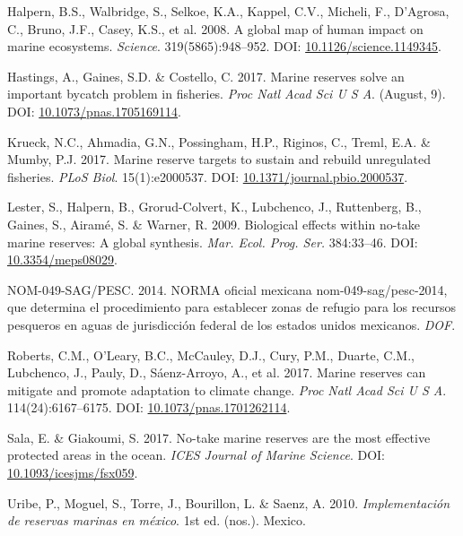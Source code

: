 \documentclass[12pt,]{article}
\begin{document}
\hypertarget{ref-halpern_2008-dK}{}
Halpern, B.S., Walbridge, S., Selkoe, K.A., Kappel, C.V., Micheli, F.,
D'Agrosa, C., Bruno, J.F., Casey, K.S., et al. 2008. A global map of
human impact on marine ecosystems. \emph{Science}. 319(5865):948--952.
DOI:
\href{https://doi.org/10.1126/science.1149345}{10.1126/science.1149345}.

\hypertarget{ref-hastings_2017-sm}{}
Hastings, A., Gaines, S.D. \& Costello, C. 2017. Marine reserves solve
an important bycatch problem in fisheries. \emph{Proc Natl Acad Sci U S
A}. (August, 9). DOI:
\href{https://doi.org/10.1073/pnas.1705169114}{10.1073/pnas.1705169114}.

\hypertarget{ref-krueck_2017-J1}{}
Krueck, N.C., Ahmadia, G.N., Possingham, H.P., Riginos, C., Treml, E.A.
\& Mumby, P.J. 2017. Marine reserve targets to sustain and rebuild
unregulated fisheries. \emph{PLoS Biol}. 15(1):e2000537. DOI:
\href{https://doi.org/10.1371/journal.pbio.2000537}{10.1371/journal.pbio.2000537}.

\hypertarget{ref-lester_2009-Ks}{}
Lester, S., Halpern, B., Grorud-Colvert, K., Lubchenco, J., Ruttenberg,
B., Gaines, S., Airamé, S. \& Warner, R. 2009. Biological effects within
no-take marine reserves: A global synthesis. \emph{Mar. Ecol. Prog.
Ser.} 384:33--46. DOI:
\href{https://doi.org/10.3354/meps08029}{10.3354/meps08029}.

\hypertarget{ref-nom049sagpesc_2014-V6}{}
NOM-049-SAG/PESC. 2014. NORMA oficial mexicana nom-049-sag/pesc-2014,
que determina el procedimiento para establecer zonas de refugio para los
recursos pesqueros en aguas de jurisdicción federal de los estados
unidos mexicanos. \emph{DOF}.

\hypertarget{ref-roberts_2017-J9}{}
Roberts, C.M., O'Leary, B.C., McCauley, D.J., Cury, P.M., Duarte, C.M.,
Lubchenco, J., Pauly, D., Sáenz-Arroyo, A., et al. 2017. Marine reserves
can mitigate and promote adaptation to climate change. \emph{Proc Natl
Acad Sci U S A}. 114(24):6167--6175. DOI:
\href{https://doi.org/10.1073/pnas.1701262114}{10.1073/pnas.1701262114}.

\hypertarget{ref-sala_2017-69}{}
Sala, E. \& Giakoumi, S. 2017. No-take marine reserves are the most
effective protected areas in the ocean. \emph{ICES Journal of Marine
Science}. DOI:
\href{https://doi.org/10.1093/icesjms/fsx059}{10.1093/icesjms/fsx059}.

\hypertarget{ref-uribe_2010-u2}{}
Uribe, P., Moguel, S., Torre, J., Bourillon, L. \& Saenz, A. 2010.
\emph{Implementación de reservas marinas en méxico}. 1st ed. (nos.).
Mexico.
\end{document}
